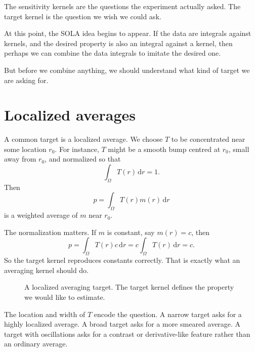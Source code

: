 \documentclass[11pt,openany]{book}
\theoremstyle{definition}
\theoremstyle{remark}
\newcommand{\dd}{\,\mathrm d}
\begin{document}
\begin{intuitionbox}
The sensitivity kernels are the questions the experiment actually asked. The target kernel is the
question we wish we could ask.
\end{intuitionbox}

At this point, the SOLA idea begins to appear. If the data are integrals against kernels, and the
desired property is also an integral against a kernel, then perhaps we can combine the data
integrals to imitate the desired one.

But before we combine anything, we should understand what kind of target we are asking for.

\section{Localized averages}

A common target is a localized average. We choose \(T\) to be concentrated near some location
\(r_0\). For instance, \(T\) might be a smooth bump centred at \(r_0\), small away from \(r_0\),
and normalized so that
\[
  \int_\Omega T(r)\dd r=1.
\]
Then
\[
  p
  =
  \int_\Omega T(r)m(r)\dd r
\]
is a weighted average of \(m\) near \(r_0\).

The normalization matters. If \(m\) is constant, say \(m(r)=c\), then
\[
  p
  =
  \int_\Omega T(r)c\dd r
  =
  c\int_\Omega T(r)\dd r
  =
  c.
\]
So the target kernel reproduces constants correctly. That is exactly what an averaging kernel
should do.

\begin{figure}[ht]
  \centering
  \caption{A localized averaging target. The target kernel defines the property we would like to
  estimate.}
  \label{fig:act1-target-kernel}
\end{figure}

The location and width of \(T\) encode the question. A narrow target asks for a highly localized
average. A broad target asks for a more smeared average. A target with oscillations asks for a
contrast or derivative-like feature rather than an ordinary average.
\end{document}
